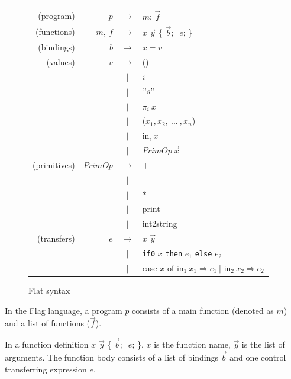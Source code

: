\documentclass{article}
\theoremstyle{definition}
\theoremstyle{remark}
\numberwithin{equation}{section}
\begin{document}
\begin{figure}[!ht]
  \centering
\begin{tabular}{rrcl}
       &     &  &\\
(program) & $p$ & $\to$ & $m$; $\vec{f}$ \\

(functions) & $m,\ f$ & $\to$ & $x$ $\vec{y}$ \{
      $\vec{b};$  $\ e$; \}\\

(bindings) & $b$ & $\to$ & $x=v$ \\

(values) & $v$ & $\to$ & () \\
        &     & $|$ & $i$\\
        &     & $|$ & $"s"$\\
        &     & $|$ & $\pi _i\ x$\\
        &     & $|$ & ($x_1,x_2,\ ...\ , x_n$)\\
        &     & $|$ & \textsf{in}$_i\ x$\\
        &     & $|$ &  $PrimOp\ \vec{x}$\\

(primitives) & $PrimOp$ & $\to$ & $+$ \\
        &     & $|$ & $-$\\
        &     & $|$ & $*$\\
        &     & $|$ & \textsf{print}\\
        &     & $|$ & \textsf{int2string}\\

(transfers) & $e$ & $\to$ & $x$ $\vec{y}$\\
        &     & $|$ & \texttt{if0} $x$ \texttt{then} $e_1$ \texttt{else} $e_2$\\
        &     & $|$ & \textsf{case} $x$ \textsf{of in}$_1\ x_1 \Rightarrow e_1
                    \ |$ \textsf{in}$_2\ x_2 \Rightarrow e_2$\\
\end{tabular}
  \caption{Flat syntax}
  \label{fig-sub}
\end{figure}

In the Flag language, a program $p$ consists of a main function
(denoted as $m$) and a list of functions ($\vec{f}$).

In a function definition $x$ $\vec{y}$ \{ $\vec{b};$  $\ e$; \},
$x$ is the function name, $\vec{y}$ is the list of arguments.
 The function body consists of a list of
 bindings $\vec{b}$ and one control transferring expression $e$.
\end{document}

